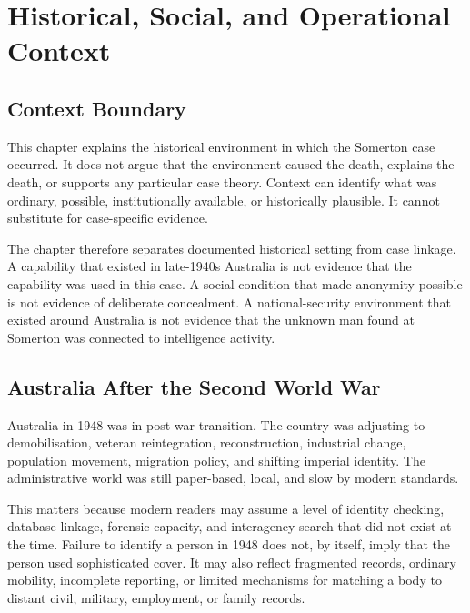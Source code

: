 \chapter{Historical, Social, and Operational Context}
\label{chap:historical-operational-context}


\section{Context Boundary}

This chapter explains the historical environment in which the Somerton case occurred. It does not argue that the environment caused the death, explains the death, or supports any particular case theory. Context can identify what was ordinary, possible, institutionally available, or historically plausible. It cannot substitute for case-specific evidence.

The chapter therefore separates documented historical setting from case linkage. A capability that existed in late-1940s Australia is not evidence that the capability was used in this case. A social condition that made anonymity possible is not evidence of deliberate concealment. A national-security environment that existed around Australia is not evidence that the unknown man found at Somerton was connected to intelligence activity.

\section{Australia After the Second World War}

Australia in 1948 was in post-war transition. The country was adjusting to demobilisation, veteran reintegration, reconstruction, industrial change, population movement, migration policy, and shifting imperial identity. The administrative world was still paper-based, local, and slow by modern standards.

This matters because modern readers may assume a level of identity checking, database linkage, forensic capacity, and interagency search that did not exist at the time. Failure to identify a person in 1948 does not, by itself, imply that the person used sophisticated cover. It may also reflect fragmented records, ordinary mobility, incomplete reporting, or limited mechanisms for matching a body to distant civil, military, employment, or family records.

